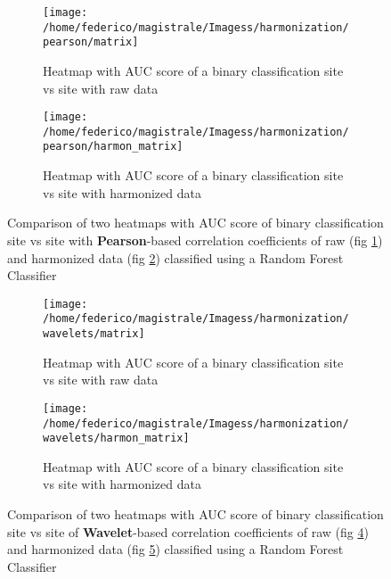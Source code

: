 \documentclass[11pt]{report}
\begin{document}
\begin{figure}
\centering
\begin{subfigure}[b]{0.8\textwidth}
   \texttt{[image: /home/federico/magistrale/Imagess/harmonization/pearson/matrix]}
   \caption{Heatmap with AUC score of a binary classification site vs site with raw data}
   \label{fig:heatmap_harmonization_harmon}
\end{subfigure}

\begin{subfigure}[b]{0.8\textwidth}
   \texttt{[image: /home/federico/magistrale/Imagess/harmonization/pearson/harmon\_matrix]}
   \caption{Heatmap with AUC score of a binary classification site vs site with harmonized data}
   \label{fig:heatmap_harmonization_noharmon}
\end{subfigure}

\caption{Comparison of two heatmaps with AUC score of binary classification site vs site with \textbf{Pearson}-based correlation coefficients of raw (fig \ref{fig:heatmap_harmonization_harmon}) and harmonized data (fig \ref{fig:heatmap_harmonization_noharmon}) classified using a Random Forest Classifier
}
\label{fig:heatmap_harmonization}
\end{figure}



\begin{figure}
\centering
\begin{subfigure}[b]{0.70\textwidth}
   \texttt{[image: /home/federico/magistrale/Imagess/harmonization/wavelets/matrix]}
   \caption{Heatmap with AUC score of a binary classification site vs site with raw data}
   \label{fig:heatmap_harmonization_harmon_w}
\end{subfigure}

\begin{subfigure}[b]{0.70\textwidth}
   \texttt{[image: /home/federico/magistrale/Imagess/harmonization/wavelets/harmon\_matrix]}
   \caption{Heatmap with AUC score of a binary classification site vs site with harmonized data}
   \label{fig:heatmap_harmonization_noharmon_w}
\end{subfigure}

\caption{Comparison of two heatmaps with AUC score of binary classification site vs site of \textbf{Wavelet}-based correlation coefficients of raw (fig \ref{fig:heatmap_harmonization_harmon_w}) and harmonized data (fig \ref{fig:heatmap_harmonization_noharmon_w}) classified using a Random Forest Classifier
}
\label{fig:heatmap_harmonization_w}
\end{figure}
\end{document}
